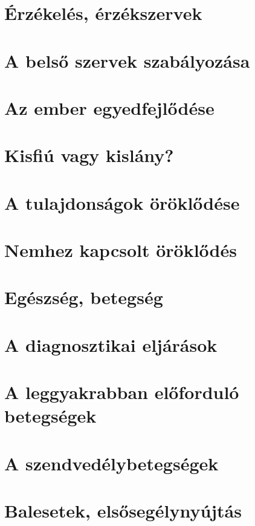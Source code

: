 \documentclass{article}
\begin{document}
\section{Érzékelés, érzékszervek}
\section{A belső szervek szabályozása}
\section{Az ember egyedfejlődése} %

\section{Kisfiú vagy kislány?} %
\section{A tulajdonságok öröklődése}
\section{Nemhez kapcsolt öröklődés} 

\section{Egészség, betegség}
\section{A diagnosztikai eljárások}
\section{A leggyakrabban előforduló betegségek}
\section{A szendvedélybetegségek}
\section{Balesetek, elsősegélynyújtás}
\end{document}

